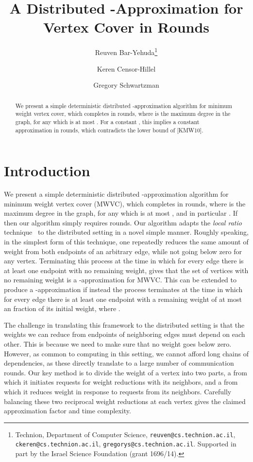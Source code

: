 \documentclass[11pt]{article}
\newcommand*\samethanks[1][\value{footnote}]{\footnotemark[#1]}
\begin{document}
\begin{titlepage}
\title{A Distributed -Approximation for\\ Vertex Cover in  Rounds}
\author{Reuven Bar-Yehuda\thanks{Technion, Department of Computer Science, \texttt{reuven@cs.technion.ac.il}, \texttt{ckeren@cs.technion.ac.il}, \texttt{gregorys@cs.technion.ac.il}. Supported in part by the Israel Science Foundation (grant 1696/14).}
\and Keren Censor-Hillel\samethanks \and Gregory Schwartzman\samethanks}
\maketitle

\begin{abstract}
We present a simple deterministic distributed -approximation algorithm for minimum weight vertex cover, which completes in  rounds, where  is the maximum degree in the graph, for any  which is at most . For a constant , this implies a constant approximation in  rounds, which contradicts the lower bound of [KMW10].
\end{abstract}

\thispagestyle{empty}
\end{titlepage}

\section{Introduction}
We present a simple deterministic distributed -approximation algorithm for minimum weight vertex cover (MWVC), which completes in  rounds, where  is the maximum degree in the graph, for any  which is at most , and in particular . If  then our algorithm simply requires  rounds.
Our algorithm adapts the \emph{local ratio} technique~\cite{BarYehudaE1985} to the distributed setting in a novel simple manner. Roughly speaking, in the simplest form of this technique, one repeatedly reduces the same amount of weight from both endpoints of an arbitrary edge, while not going below zero for any vertex. Terminating this process at the time in which for every edge there is at least one endpoint with no remaining weight, gives that the set of vertices with no remaining weight is a -approximation for MWVC. This can be extended to produce a -approximation if instead the process terminates at the time in which for every edge there is at least one endpoint with a remaining weight of at most an  fraction of its initial weight, where .

The challenge in translating this framework to the distributed setting is that the weights we can reduce from endpoints of neighboring edges must depend on each other. This is because we need to make sure that no weight goes below zero. However, as common to computing in this setting, we cannot afford long chains of dependencies, as these directly translate to a large number of communication rounds. Our key method is to divide the weight of a vertex into two parts, a  from which it initiates requests for weight reductions with its neighbors, and a  from which it reduces weight in response to requests from its neighbors. Carefully balancing these two reciprocal weight reductions at each vertex gives the claimed  approximation factor and  time complexity.
\end{document}
